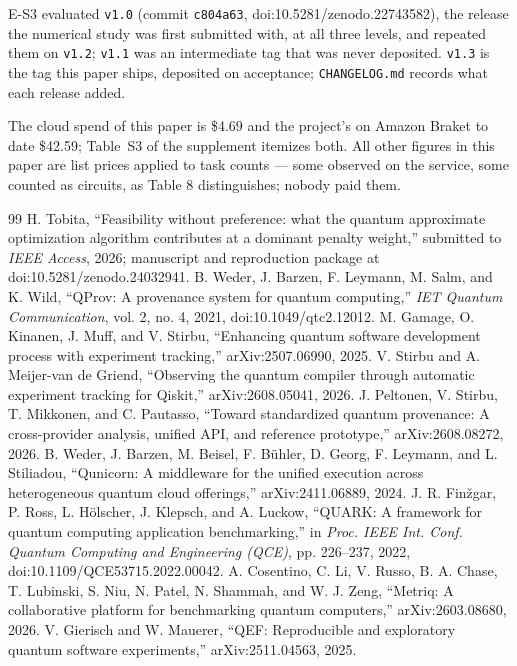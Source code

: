\documentclass[acmsmall,screen,review]{acmart}
\begin{document}
E-S3 evaluated \texttt{v1.0} (commit \texttt{c804a63}, doi:10.5281/zenodo.22743582), the release the numerical study \cite{ref1} was first submitted with, at all three levels, and repeated them on \texttt{v1.2}; \texttt{v1.1} was an intermediate tag that was never deposited. \texttt{v1.3} is the tag this paper ships, deposited on acceptance; \texttt{CHANGELOG.md} records what each release added.


The cloud spend of this paper is \$4.69 and the project's on Amazon Braket to date \$42.59; Table~S3 of the supplement itemizes both. All other figures in this paper are list prices applied to task counts --- some observed on the service, some counted as circuits, as Table 8 distinguishes; nobody paid them.


\begin{thebibliography}{99}
 H. Tobita, ``Feasibility without preference: what the quantum approximate optimization algorithm contributes at a dominant penalty weight,'' submitted to \textit{IEEE Access}, 2026; manuscript and reproduction package at doi:10.5281/zenodo.24032941.
 B. Weder, J. Barzen, F. Leymann, M. Salm, and K. Wild, ``QProv: A provenance system for quantum computing,'' \textit{IET Quantum Communication}, vol. 2, no. 4, 2021, doi:10.1049/qtc2.12012.
 M. Gamage, O. Kinanen, J. Muff, and V. Stirbu, ``Enhancing quantum software development process with experiment tracking,'' arXiv:2507.06990, 2025.
 V. Stirbu and A. Meijer-van de Griend, ``Observing the quantum compiler through automatic experiment tracking for Qiskit,'' arXiv:2608.05041, 2026.
 J. Peltonen, V. Stirbu, T. Mikkonen, and C. Pautasso, ``Toward standardized quantum provenance: A cross-provider analysis, unified API, and reference prototype,'' arXiv:2608.08272, 2026.
 B. Weder, J. Barzen, M. Beisel, F. B\"{u}hler, D. Georg, F. Leymann, and L. Stiliadou, ``Qunicorn: A middleware for the unified execution across heterogeneous quantum cloud offerings,'' arXiv:2411.06889, 2024.
 J. R. Fin\v{z}gar, P. Ross, L. H\"{o}lscher, J. Klepsch, and A. Luckow, ``QUARK: A framework for quantum computing application benchmarking,'' in \textit{Proc. IEEE Int. Conf. Quantum Computing and Engineering (QCE)}, pp. 226--237, 2022, doi:10.1109/QCE53715.2022.00042.
 A. Cosentino, C. Li, V. Russo, B. A. Chase, T. Lubinski, S. Niu, N. Patel, N. Shammah, and W. J. Zeng, ``Metriq: A collaborative platform for benchmarking quantum computers,'' arXiv:2603.08680, 2026.
 V. Gierisch and W. Mauerer, ``QEF: Reproducible and exploratory quantum software experiments,'' arXiv:2511.04563, 2025.

\end{thebibliography}
\end{document}
